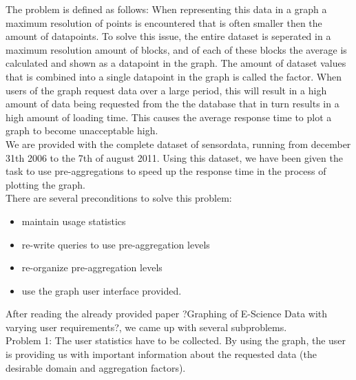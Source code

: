 The problem is defined as follows: When representing this data in a graph a maximum resolution of points is encountered that is often smaller then the amount of datapoints. To solve this issue, the entire dataset is seperated in a maximum resolution amount of blocks, and of each of these blocks the average is calculated and shown as a datapoint in the graph. The amount of dataset values that is combined into a single datapoint in the graph is called the factor. When users of the graph request data over a large period, this will result in a high amount of data being requested from the the database that in turn results in a high amount of loading time. This causes the average response time to plot a graph to become unacceptable high.\\



We are provided with the complete dataset of sensordata, running from december 31th 2006 to the 7th of august 2011. Using this dataset, we have been given the task to use pre-aggregations to speed up the response time in the process of plotting the graph.\\

There are several preconditions to solve this problem:
\begin{itemize}
\item maintain usage statistics 
\item re-write queries to use pre-aggregation levels
\item re-organize pre-aggregation levels
\item use the graph user interface provided.
\end{itemize}

After reading the already provided paper ?Graphing of E-Science Data with varying user requirements?, we came up with several subproblems.\\

Problem 1: The user statistics have to be collected.
By using the graph, the user is providing us with important information about the requested data (the desirable domain and aggregation factors).\\


